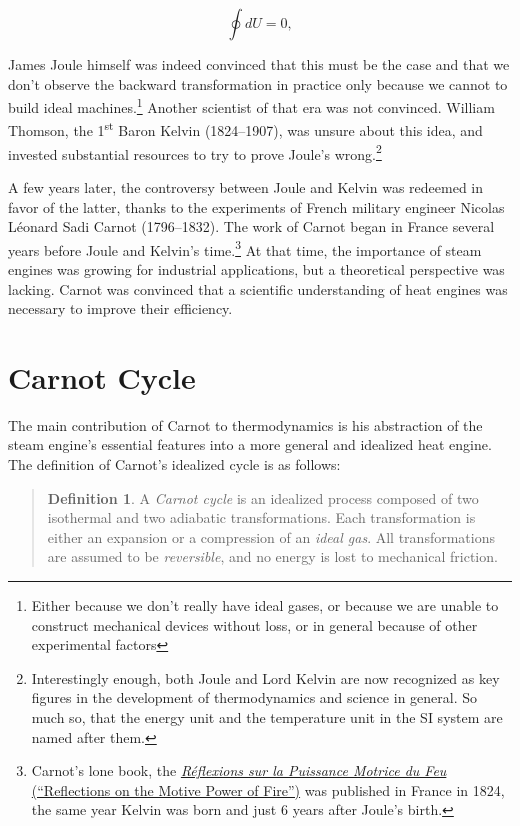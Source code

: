 \documentclass[
]{book}
\theoremstyle{definition}
\newtheorem{definition}{Definition}[chapter]
\theoremstyle{definition}
\theoremstyle{definition}
\theoremstyle{remark}
\begin{document}
\begin{equation}
  \oint dU=0,
  \label{eq:de0c}
\end{equation}

James Joule himself was indeed convinced that this must be the case and that we don't observe the backward transformation in practice only because we cannot to build ideal machines.\footnote{Either because we don't really have ideal gases, or because we are unable to construct mechanical devices without loss, or in general because of other experimental factors} Another scientist of that era was not convinced. William Thomson, the 1\textsuperscript{st} Baron Kelvin (1824--1907), was unsure about this idea, and invested substantial resources to try to prove Joule's wrong.\footnote{Interestingly enough, both Joule and Lord Kelvin are now recognized as key figures in the development of thermodynamics and science in general. So much so, that the energy unit and the temperature unit in the SI system are named after them.}

A few years later, the controversy between Joule and Kelvin was redeemed in favor of the latter, thanks to the experiments of French military engineer Nicolas Léonard Sadi Carnot (1796--1832). The work of Carnot began in France several years before Joule and Kelvin's time.\footnote{Carnot's lone book, the \href{https://en.wikipedia.org/wiki/Reflections_on_the_Motive_Power_of_Fire}{\emph{Réflexions sur la Puissance Motrice du Feu} (``Reflections on the Motive Power of Fire'')} was published in France in 1824, the same year Kelvin was born and just 6 years after Joule's birth.} At that time, the importance of steam engines was growing for industrial applications, but a theoretical perspective was lacking. Carnot was convinced that a scientific understanding of heat engines was necessary to improve their efficiency.

\hypertarget{carnotcyclesect}{%
\section{Carnot Cycle}\label{carnotcyclesect}}

The main contribution of Carnot to thermodynamics is his abstraction of the steam engine's essential features into a more general and idealized heat engine. The definition of Carnot's idealized cycle is as follows:

\begin{quote}
\begin{definition}
\protect\hypertarget{def:carnotcycle}{}{\label{def:carnotcycle} }
A \emph{Carnot cycle} is an idealized process composed of two isothermal and two adiabatic transformations. Each transformation is either an expansion or a compression of an \emph{ideal gas}. All transformations are assumed to be \emph{reversible}, and no energy is lost to mechanical friction.
\end{definition}
\end{quote}
\end{document}
